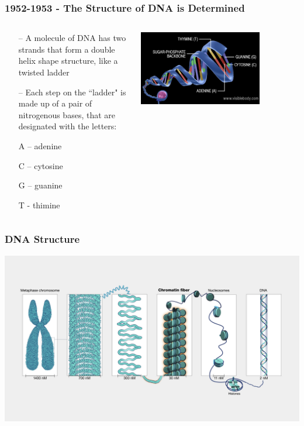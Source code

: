 \documentclass{beamer}
\begin{document}
	\begin{frame}
		\frametitle{1952-1953 - The Structure of DNA is Determined}
		\begin{columns}
			\begin{column}{0.44\textwidth}
				
				
\begin{itemize}

\small
	\item[--] A molecule of DNA has two strands that form a double helix shape structure, like a twisted ladder
		\item[--] Each step on the ``ladder" is made up of a pair of nitrogenous bases, that are designated with the letters:
		\item[] A – adenine
		\item[] C – cytosine
		\item[] G – guanine
		\item[] T - thimine
	
		
	\end{itemize}		
\end{column}
\begin{column}{0.8\textwidth}
\centering \includegraphics[keepaspectratio, width  =0.75\textwidth]{img/DNA_cartoon}  

\end{column}
\end{columns}
\end{frame}
	
	
	\begin{frame}
			\frametitle{DNA Structure}
\centering \includegraphics[keepaspectratio, width = \textwidth]{img/chromosomeToDNA}\\


	\end{frame}
	
\end{document}
